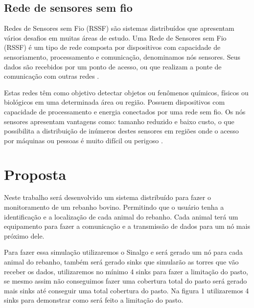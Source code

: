 \documentclass[12pt]{article}
\begin{document}
	\subsection{Rede de sensores sem fio}
	Redes de Sensores sem Fio (RSSF) são sistemas distribuídos que apresentam vários desafios em muitas áreas de estudo. Uma Rede de Sensores sem Fio (RSSF) é um tipo de rede composta por dispositivos com capacidade de sensoriamento, processamento e comunicação, denominamos nós sensores. Seus dados são recebidos por um ponto de acesso, ou que realizam a ponte de comunicação com outras redes \cite{loureiro2003redes}.
	
    Estas redes têm como objetivo detectar objetos ou fenômenos químicos, físicos ou biológicos em uma determinada área ou região. Possuem dispositivos com capacidade de processamento e energia conectados por uma rede sem fio. Os nós sensores apresentam vantagens como: tamanho reduzido e baixo custo, o que possibilita a distribuição de inúmeros destes sensores em regiões onde o acesso por máquinas ou pessoas é muito difícil ou perigoso \cite{MENEZES:04}.

	

\section{Proposta}
Neste trabalho será desenvolvido um sistema distribuído para fazer o monitoramento de um rebanho bovino. Permitindo que o usuário tenha a identificação e a localização de cada animal do rebanho. Cada animal terá um equipamento para fazer a comunicação e a transmissão de dados para um nó mais próximo dele.

Para fazer essa simulação utilizaremos o Sinalgo e será gerado um nó para cada animal do rebanho, também será gerado sinks que simularão as torres que vão receber os dados, utilizaremos no mínimo 4 sinks para fazer a limitação do pasto, se mesmo assim não conseguimos fazer uma cobertura total do pasto será gerado mais sinks até conseguir uma total cobertura do pasto. Na figura 1 utilizaremos 4 sinks para demonstrar como será feito a limitação do pasto.
\end{document}
